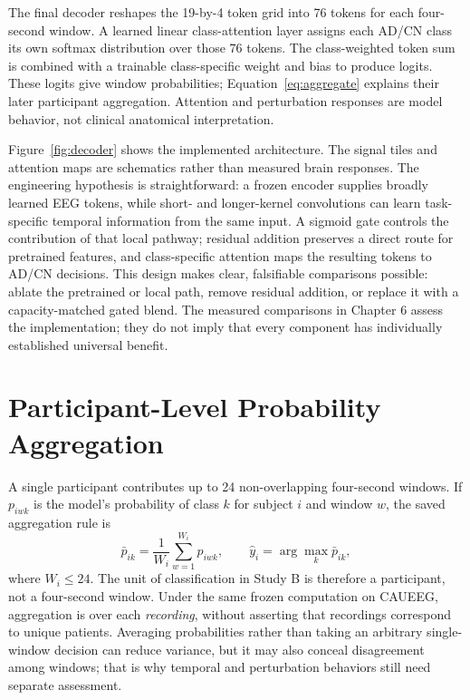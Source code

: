 The final decoder reshapes the 19-by-4 token grid into 76 tokens for each four-second window. A learned linear class-attention layer assigns each AD/CN class its own softmax distribution over those 76 tokens. The class-weighted token sum is combined with a trainable class-specific weight and bias to produce logits. These logits give window probabilities; Equation~\ref{eq:aggregate} explains their later participant aggregation. Attention and perturbation responses are model behavior, not clinical anatomical interpretation.


Figure~\ref{fig:decoder} shows the implemented architecture. The signal tiles and attention maps are schematics rather than measured brain responses. The engineering hypothesis is straightforward: a frozen encoder supplies broadly learned EEG tokens, while short- and longer-kernel convolutions can learn task-specific temporal information from the same input. A sigmoid gate controls the contribution of that local pathway; residual addition preserves a direct route for pretrained features, and class-specific attention maps the resulting tokens to AD/CN decisions. This design makes clear, falsifiable comparisons possible: ablate the pretrained or local path, remove residual addition, or replace it with a capacity-matched gated blend. The measured comparisons in Chapter 6 assess the implementation; they do not imply that every component has individually established universal benefit.

\section{Participant-Level Probability Aggregation}
A single participant contributes up to 24 non-overlapping four-second windows. If $p_{iwk}$ is the model's probability of class $k$ for subject $i$ and window $w$, the saved aggregation rule is
\begin{equation}
\bar p_{ik}=\frac{1}{W_i}\sum_{w=1}^{W_i}p_{iwk},\qquad
\hat y_i=\arg\max_k\bar p_{ik},
\label{eq:aggregate}
\end{equation}
where $W_i\leq24$. The unit of classification in Study B is therefore a participant, not a four-second window. Under the same frozen computation on CAUEEG, aggregation is over each \emph{recording}, without asserting that recordings correspond to unique patients. Averaging probabilities rather than taking an arbitrary single-window decision can reduce variance, but it may also conceal disagreement among windows; that is why temporal and perturbation behaviors still need separate assessment.

